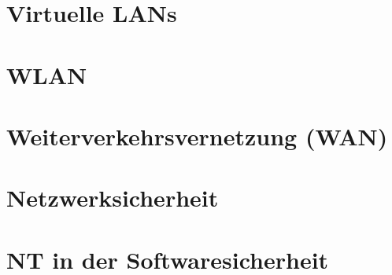 \documentclass{article}
\begin{document}
	\section{Virtuelle LANs}
	\section{WLAN}
	\section{Weiterverkehrsvernetzung (WAN)}
	\section{Netzwerksicherheit}
	\section{NT in der Softwaresicherheit}
	























  
\end{document}
